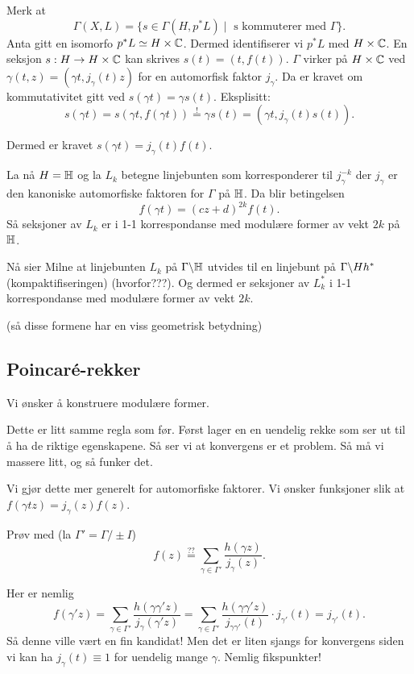 \message{ !name(seminar30april15.tex)}\documentclass[11pt, english]{article}
\begin{document}
Merk at
\[
\Gamma(X,L) = \{ s \in \Gamma(H, p^\ast L) \mid \text{ s kommuterer med $\Gamma$} \}.
\]
Anta gitt en isomorfo $p^\ast L \simeq H \times \mathbb{C}$. Dermed identifiserer vi $p^\ast L$ med $H \times \mathbb{C}$. En seksjon $s:H \to H \times \mathbb{C}$ kan skrives $s(t)=(t,f(t))$. $\Gamma$ virker på $H \times \mathbb{C}$ ved $\gamma(t,z) = (\gamma t, j_\gamma(t)z)$ for en automorfisk faktor $j_\gamma$. Da er kravet om kommutativitet gitt ved $s(\gamma t)=\gamma s(t)$. Eksplisitt:
\[
s(\gamma t) = s(\gamma t, f(\gamma t)) \stackrel{!}{=} \gamma s(t) = (\gamma t, j_\gamma(t) s(t)).
\]

Dermed er kravet $s(\gamma t) = j_\gamma(t) f(t)$.

La nå $H= \mathbb{H}$ og la  $L_k$ betegne linjebunten som korresponderer til $j_\gamma^{-k}$ der $j_\gamma$ er den kanoniske automorfiske faktoren for $\Gamma$ på $\mathbb{H}$. Da blir betingelsen
\[
f(\gamma t) = (cz+d)^{2k} f(t).
\]
Så seksjoner av $L_k$ er i 1-1 korrespondanse med modulære former av vekt $2k$ på $\mathbb{H}$. 

Nå sier Milne at linjebunten $L_k$ på $\Gamma \backslash \mathbb{H}$ utvides til en linjebunt på $\Gamma \backslash Hh^\ast$ (kompaktifiseringen) (hvorfor???). Og dermed er seksjoner av $L_k^\ast$ i 1-1 korrespondanse med modulære former av vekt $2k$. 

(så disse formene har en viss geometrisk betydning)

\subsection{Poincaré-rekker}

Vi ønsker å konstruere modulære former.

Dette er litt samme regla som før. Først lager en en uendelig rekke som ser ut til å ha de riktige egenskapene. Så ser vi at konvergens er et problem. Så må vi massere litt, og så funker det.

Vi gjør dette mer generelt for automorfiske faktorer. Vi ønsker funksjoner slik at $f(\gamma t z) = j_\gamma (z) f(z)$. 

Prøv med (la $\Gamma' = \Gamma/\pm I$)
\[
f(z) \stackrel{??}{=} \sum_{\gamma \in \Gamma'} \frac{h(\gamma z)}{j_\gamma(z)}.
\]

Her er nemlig
 \[
 f(\gamma' z) = \sum_{\gamma \in \Gamma'} \frac{h(\gamma \gamma' z)}{j_\gamma (\gamma' z)} = \sum_{\gamma \in \Gamma'} \frac{h(\gamma \gamma' z)}{j_{\gamma \gamma'}(t)} \cdot j_{\gamma'} (t)  = j_{\gamma'} (t).
\] 
Så denne ville vært en fin kandidat! Men det er liten sjangs for konvergens siden vi kan ha $j_\gamma(t) \equiv 1$ for uendelig mange $\gamma$. Nemlig fikspunkter! 
\end{document}
